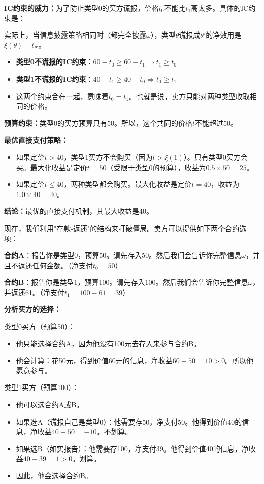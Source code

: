 \textbf{IC约束的威力：}为了防止类型0的买方谎报，价格$t_0$不能比$t_1$高太多。具体的IC约束是：

实际上，当信息披露策略相同时（都完全披露$\omega$），类型$\theta$谎报成$\theta'$的净效用是$\xi(\theta)-t_{\theta'}$。

\begin{itemize}
    \item \textbf{类型0不谎报的IC约束}：$60 - t_0 \geq 60 - t_1 \Rightarrow t_1 \geq t_0$
    \item \textbf{类型1不谎报的IC约束}：$40 - t_1 \geq 40 - t_0 \Rightarrow t_0 \geq t_1$
    \item 这两个约束合在一起，意味着$t_0 = t_1$。也就是说，卖方只能对两种类型收取相同的价格。
\end{itemize}

\textbf{预算约束：}类型0的买方预算只有50。所以，这个共同的价格$t$不能超过50。

\textbf{最优直接支付策略：}
\begin{itemize}
    \item 如果定价$t > 40$，类型1买方不会购买（因为$t > \xi(1)$）。只有类型0买方会买。最大化收益是定价$t=50$（受限于类型0的预算），收益为$0.5 \times 50 = 25$。
    \item 如果定价$t \leq 40$，两种类型都会购买。最大化收益是定价$t=40$，收益为$1.0 \times 40 = 40$。
\end{itemize}

\textbf{结论：}最优的直接支付机制，其最大收益是40。

现在，我们利用"存款-返还"的结构来打破僵局。卖方可以提供如下两个合约选项：

\textbf{合约A}：报告你是类型0，预算50。请先存入50。然后我们会告诉你完整信息$\omega$，并且不返还任何金额。（净支付$t_0 = 50$）

\textbf{合约B}：报告你是类型1，预算100。请先存入100。然后我们会告诉你完整信息$\omega$，并返还61。（净支付$t_1 = 100 - 61 = 39$）

\textbf{分析买方的选择：}

类型0买方（预算50）：
\begin{itemize}
    \item 他只能选择合约A，因为他没有100元去存入来参与合约B。
    \item 他会计算：花50元，得到价值60元的信息，净收益$60 - 50 = 10 > 0$。所以他愿意参与。
\end{itemize}

类型1买方（预算100）：
\begin{itemize}
    \item 他可以选合约A或B。
    \item 如果选A（谎报自己是类型0）：他需要存50，净支付50。他得到价值40的信息，净收益$40 - 50 = -10$。不划算。
    \item 如果选B（如实报告）：他需要存100，净支付39。他得到价值40的信息，净收益$40 - 39 = 1 > 0$。划算。
    \item 因此，他会选择合约B。
\end{itemize}

